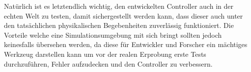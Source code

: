 Natürlich ist es letztendlich wichtig, den entwickelten Controller auch in der echten Welt zu testen, damit sichergestellt werden kann, dass dieser auch unter den tatsächlichen physikalischen Begebenheiten zuverlässig funktioniert.
Die Vorteile welche eine Simulationsumgebung mit sich bringt sollten jedoch keinesfalls übersehen werden, da diese für Entwickler und Forscher ein mächtiges Werkzeug darstellen kann um vor der realen Erprobung erste Tests durchzuführen, Fehler aufzudecken und den Controller zu verbessern.



